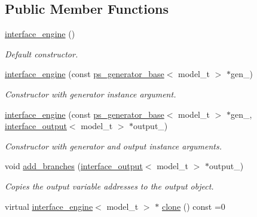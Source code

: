 \subsection*{Public Member Functions}
\begin{DoxyCompactItemize}
\item 
\hypertarget{a00318_a343963d3ea0e66429432e8496534c142}{}\hyperlink{a00318_a343963d3ea0e66429432e8496534c142}{interface\+\_\+engine} ()\label{a00318_a343963d3ea0e66429432e8496534c142}

\begin{DoxyCompactList}\small\item\em Default constructor. \end{DoxyCompactList}\item 
\hypertarget{a00318_ad342ed491c8c93e057a8581496fd9dd7}{}\hyperlink{a00318_ad342ed491c8c93e057a8581496fd9dd7}{interface\+\_\+engine} (const \hyperlink{a00451}{ps\+\_\+generator\+\_\+base}$<$ model\+\_\+t $>$ $\ast$gen\+\_\+)\label{a00318_ad342ed491c8c93e057a8581496fd9dd7}

\begin{DoxyCompactList}\small\item\em Constructor with generator instance argument. \end{DoxyCompactList}\item 
\hypertarget{a00318_aa7f1746c6c1a6b5d382308423a16b086}{}\hyperlink{a00318_aa7f1746c6c1a6b5d382308423a16b086}{interface\+\_\+engine} (const \hyperlink{a00451}{ps\+\_\+generator\+\_\+base}$<$ model\+\_\+t $>$ $\ast$gen\+\_\+, \hyperlink{a00319}{interface\+\_\+output}$<$ model\+\_\+t $>$ $\ast$output\+\_\+)\label{a00318_aa7f1746c6c1a6b5d382308423a16b086}

\begin{DoxyCompactList}\small\item\em Constructor with generator and output instance arguments. \end{DoxyCompactList}\item 
\hypertarget{a00318_abcf2a665d45d27762db5e3ba01eae5e1}{}void \hyperlink{a00318_abcf2a665d45d27762db5e3ba01eae5e1}{add\+\_\+branches} (\hyperlink{a00319}{interface\+\_\+output}$<$ model\+\_\+t $>$ $\ast$output\+\_\+)\label{a00318_abcf2a665d45d27762db5e3ba01eae5e1}

\begin{DoxyCompactList}\small\item\em Copies the output variable addresses to the output object. \end{DoxyCompactList}\item 
\hypertarget{a00318_a756e355ca2e52d691dc616acaa3e61be}{}virtual \hyperlink{a00318}{interface\+\_\+engine}$<$ model\+\_\+t $>$ $\ast$ \hyperlink{a00318_a756e355ca2e52d691dc616acaa3e61be}{clone} () const =0\label{a00318_a756e355ca2e52d691dc616acaa3e61be}


\end{DoxyCompactItemize}
